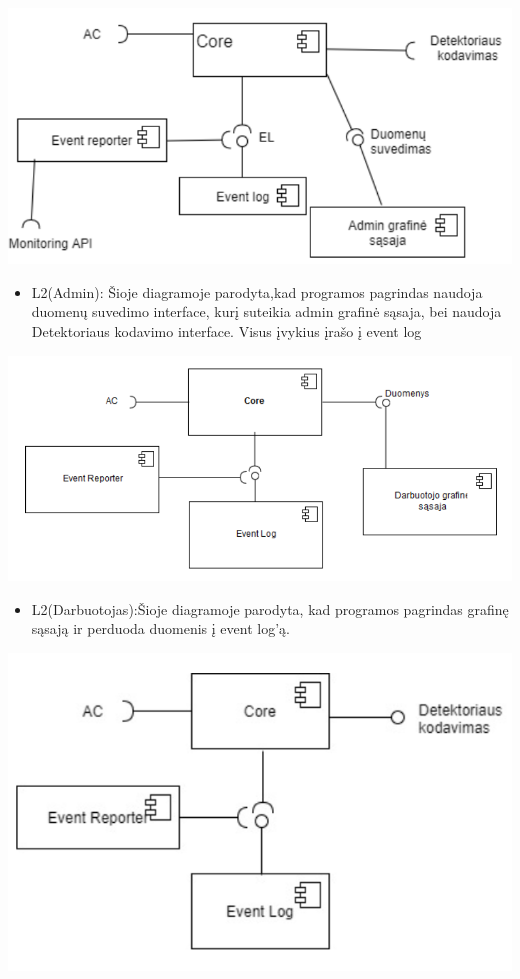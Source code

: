 ﻿\documentclass[oneside]{VUMIFPSkursinis}
\begin{document}
	\includegraphics[width=\textwidth,height=\textheight,keepaspectratio]{l2admin.png}
	
	\begin{itemize}
		\item L2(Admin): Šioje diagramoje parodyta,kad programos pagrindas naudoja duomenų suvedimo interface, kurį suteikia admin grafinė sąsaja, bei naudoja Detektoriaus kodavimo interface. Visus įvykius įrašo į event log

	\end{itemize}

		\includegraphics[width=\textwidth,height=\textheight,keepaspectratio]{l2darb.png}

\begin{itemize}
		\item L2(Darbuotojas):Šioje diagramoje parodyta, kad programos pagrindas  grafinę sąsają ir perduoda duomenis į event log’ą. 

	\end{itemize}

		\includegraphics[width=\textwidth,height=\textheight,keepaspectratio]{l2det.png}
\end{document}
